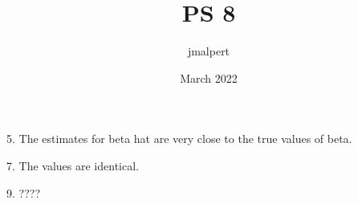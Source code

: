 \documentclass{article}
\title{PS 8}
\author{jmalpert }
\date{March 2022}
\begin{document}
\maketitle

5. The estimates for beta hat are very close to the true values of beta.

7. The values are identical.

9. ????
  
  
\end{document}
